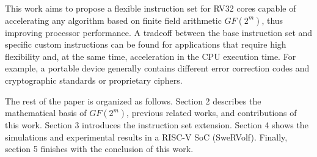 This work aims to propose a flexible instruction set for RV32 cores
capable of accelerating any algorithm based on finite field arithmetic $GF(2^m)$, thus improving processor performance. A tradeoff 
between the base instruction set and specific custom instructions can be found for applications that require high flexibility and, 
at the same time, acceleration in the CPU execution time. For example, a portable device generally contains different error correction codes 
and cryptographic standards or proprietary ciphers.


The rest of the paper is organized as follows. Section 2 describes the mathematical basis of $GF(2^m)$, previous related works, 
and contributions of this work. Section 3 introduces the instruction set extension. Section 4 shows the simulations and 
experimental results in a RISC-V SoC (SweRVolf). Finally, section 5 finishes with the conclusion of this work.


